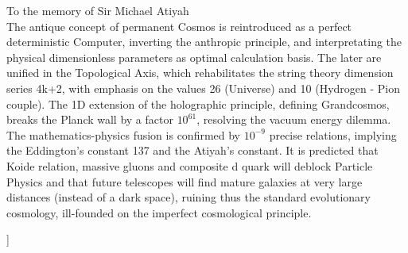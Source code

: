 \documentclass[twoside,draft]{article}
\begin{document}
\begin{sloppypar}
\begin{center}
{}\par
\medskip
{\small\parbox{11cm}{%
\hfill To the memory of Sir Michael Atiyah\\
The antique concept of permanent Cosmos is reintroduced as a perfect deterministic Computer, inverting the anthropic principle, and interpretating the physical dimensionless parameters as optimal calculation basis. The later are unified in the Topological Axis, which rehabilitates the string theory dimension series 4k+2, with emphasis on the values 26 (Universe) and 10 (Hydrogen - Pion couple). The 1D extension of the holographic principle, defining Grandcosmos, breaks the Planck wall by a factor $10^{61}$, resolving the vacuum energy dilemma. 
The mathematics-physics fusion is confirmed by $10^{-9}$ precise relations, implying the Eddington's constant 137 and the Atiyah's constant. It is predicted that Koide relation, massive gluons and composite d quark will deblock Particle Physics and that future telescopes will find mature galaxies at very large distances (instead of a dark space), ruining thus the standard evolutionary cosmology, ill-founded on the imperfect cosmological principle.

}}\smallskip
\end{center}]{%


\setcounter{section}{0}
\setcounter{equation}{0}
\setcounter{figure}{0}
\setcounter{table}{0}
\setcounter{page}{1}



}
\end{sloppypar}
\end{document}
